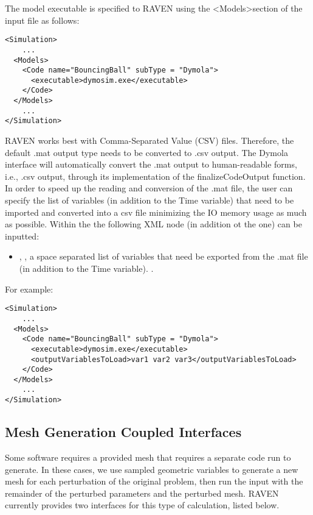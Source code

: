 The model executable is specified to RAVEN using the \textless Models\textgreater  section of the input file as follows:
\begin{lstlisting}[style=XML]
<Simulation>
    ...
  <Models>
    <Code name="BouncingBall" subType = "Dymola">
      <executable>dymosim.exe</executable>
    </Code>
  </Models>
    ...
</Simulation>
\end{lstlisting}
RAVEN works best with Comma-Separated Value (CSV) files.  Therefore, the default
.mat output type needs to be converted to .csv output.
The Dymola interface will automatically convert the .mat output to human-readable
forms, i.e., .csv output, through its implementation of the finalizeCodeOutput function.
\\In order to speed up the reading and conversion of the .mat file, the user can specify
the list of variables (in addition to the Time variable) that need to be imported and
converted into a csv file minimizing
the IO memory usage as much as possible. Within the  the following
XML
node (in addition ot the  one) can be inputted:

\begin{itemize}
   \item {}, , a space separated list of variables that need be exported from the .mat
   file (in addition to the Time variable). .
\end{itemize}
For example:
\begin{lstlisting}[style=XML]
<Simulation>
    ...
  <Models>
    <Code name="BouncingBall" subType = "Dymola">
      <executable>dymosim.exe</executable>
      <outputVariablesToLoad>var1 var2 var3</outputVariablesToLoad>
    </Code>
  </Models>
    ...
</Simulation>
\end{lstlisting}


\subsection{Mesh Generation Coupled Interfaces}
Some software requires a provided mesh that requires a separate code run to generate.
In these cases, we use sampled geometric
variables to generate a new mesh for each perturbation of the original problem, then run the input with
the remainder of the perturbed parameters and the perturbed mesh.  RAVEN currently provides two interfaces for
this type of calculation, listed below.

